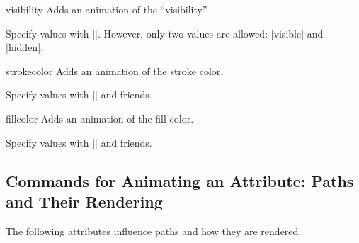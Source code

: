 \begin{sysanimateattribute}{visibility}
    Adds an animation of the ``visibility''.

    Specify values with |\pgfsysanimvaltext|. However, only two values are
    allowed: |visible| and |hidden|.
\begin{codeexample}[
    preamble={\usetikzlibrary{animations}},
    animation list={-1,0,1,2,3},
]
\end{codeexample}
\end{sysanimateattribute}

\begin{sysanimateattribute}{strokecolor}
    Adds an animation of the stroke color.

    Specify values with |\pgfsysanimvalcolorrgb| and friends.
\begin{codeexample}[
    preamble={\usetikzlibrary{animations}},
    animation list={0.5,1,1.5,2},
]
\end{codeexample}
\end{sysanimateattribute}

\begin{sysanimateattribute}{fillcolor}
    Adds an animation of the fill color.

    Specify values with |\pgfsysanimvalcolorrgb| and friends.
\begin{codeexample}[
    preamble={\usetikzlibrary{animations}},
    animation list={0.5,1,1.5,2},
]
\end{codeexample}
\end{sysanimateattribute}


\subsection{Commands for Animating an Attribute: Paths and Their Rendering}

The following attributes influence paths and how they are rendered.

